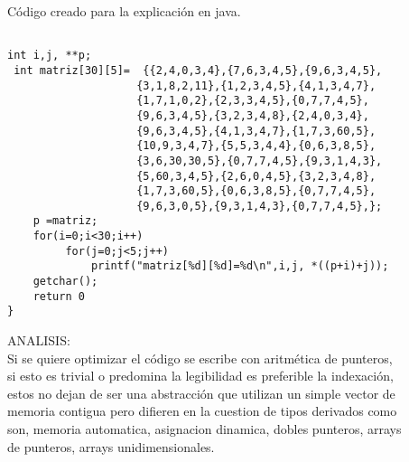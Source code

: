 \lstset{language = python}  %
Código creado para la explicación en java.
\begin{lstlisting}[frame = single] %Comienzo del Código

int i,j, **p;
 int matriz[30][5]=  {{2,4,0,3,4},{7,6,3,4,5},{9,6,3,4,5},
                    {3,1,8,2,11},{1,2,3,4,5},{4,1,3,4,7},
                    {1,7,1,0,2},{2,3,3,4,5},{0,7,7,4,5},
                    {9,6,3,4,5},{3,2,3,4,8},{2,4,0,3,4},
                    {9,6,3,4,5},{4,1,3,4,7},{1,7,3,60,5},
                    {10,9,3,4,7},{5,5,3,4,4},{0,6,3,8,5},
                    {3,6,30,30,5},{0,7,7,4,5},{9,3,1,4,3},
                    {5,60,3,4,5},{2,6,0,4,5},{3,2,3,4,8},
                    {1,7,3,60,5},{0,6,3,8,5},{0,7,7,4,5},
                    {9,6,3,0,5},{9,3,1,4,3},{0,7,7,4,5},};
    p =matriz;
    for(i=0;i<30;i++)
         for(j=0;j<5;j++)              
             printf("matriz[%d][%d]=%d\n",i,j, *((p+i)+j));
    getchar();
    return 0
}

\end{lstlisting}
ANALISIS:\\
	Si se quiere optimizar el código se escribe con aritmética de punteros,\\
	si esto es trivial o predomina la legibilidad es preferible la indexación,\\
	estos no dejan de ser una abstracción que utilizan un simple vector de\\
	memoria contigua pero difieren en la  cuestion de tipos derivados como\\
	son, memoria automatica, asignacion dinamica, dobles punteros, arrays\\
	de punteros, arrays unidimensionales.
 



